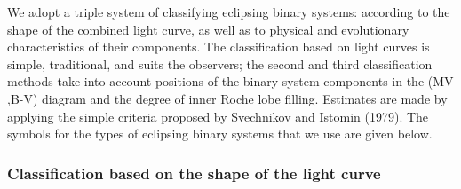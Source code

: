 We adopt a triple system of classifying eclipsing binary systems:
according to the shape of the combined light curve, as well as to
physical and evolutionary characteristics of their components. The
classification based on light curves is simple, traditional, and suits
the observers; the second and third classification methods take into
account positions of the binary-system components in the (MV ,B-V)
diagram and the degree of inner Roche lobe filling. Estimates are made
by applying the simple criteria proposed by Svechnikov and Istomin
(1979). The symbols for the types of eclipsing binary systems that we
use are given below.

\subsubsection{Classification based on the shape of the light curve}
\label{classification-based-on-the-shape-of-the-light-curve}

